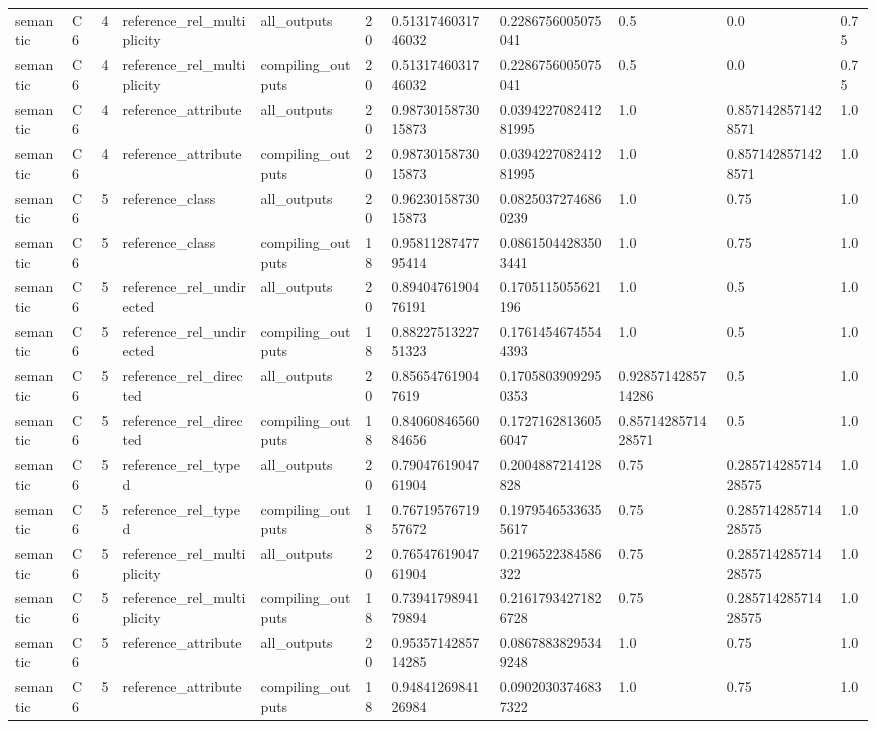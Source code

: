 \begin{tabular}{lllllllllll}
semantic & C6 & 4 & reference\_rel\_multiplicity & all\_outputs & 20 & 0.5131746031746032 & 0.2286756005075041 & 0.5 & 0.0 & 0.75 \\
semantic & C6 & 4 & reference\_rel\_multiplicity & compiling\_outputs & 20 & 0.5131746031746032 & 0.2286756005075041 & 0.5 & 0.0 & 0.75 \\
semantic & C6 & 4 & reference\_attribute & all\_outputs & 20 & 0.9873015873015873 & 0.039422708241281995 & 1.0 & 0.8571428571428571 & 1.0 \\
semantic & C6 & 4 & reference\_attribute & compiling\_outputs & 20 & 0.9873015873015873 & 0.039422708241281995 & 1.0 & 0.8571428571428571 & 1.0 \\
semantic & C6 & 5 & reference\_class & all\_outputs & 20 & 0.9623015873015873 & 0.08250372746860239 & 1.0 & 0.75 & 1.0 \\
semantic & C6 & 5 & reference\_class & compiling\_outputs & 18 & 0.9581128747795414 & 0.08615044283503441 & 1.0 & 0.75 & 1.0 \\
semantic & C6 & 5 & reference\_rel\_undirected & all\_outputs & 20 & 0.8940476190476191 & 0.1705115055621196 & 1.0 & 0.5 & 1.0 \\
semantic & C6 & 5 & reference\_rel\_undirected & compiling\_outputs & 18 & 0.8822751322751323 & 0.17614546745544393 & 1.0 & 0.5 & 1.0 \\
semantic & C6 & 5 & reference\_rel\_directed & all\_outputs & 20 & 0.856547619047619 & 0.17058039092950353 & 0.9285714285714286 & 0.5 & 1.0 \\
semantic & C6 & 5 & reference\_rel\_directed & compiling\_outputs & 18 & 0.8406084656084656 & 0.17271628136056047 & 0.8571428571428571 & 0.5 & 1.0 \\
semantic & C6 & 5 & reference\_rel\_typed & all\_outputs & 20 & 0.7904761904761904 & 0.2004887214128828 & 0.75 & 0.28571428571428575 & 1.0 \\
semantic & C6 & 5 & reference\_rel\_typed & compiling\_outputs & 18 & 0.7671957671957672 & 0.19795465336355617 & 0.75 & 0.28571428571428575 & 1.0 \\
semantic & C6 & 5 & reference\_rel\_multiplicity & all\_outputs & 20 & 0.7654761904761904 & 0.2196522384586322 & 0.75 & 0.28571428571428575 & 1.0 \\
semantic & C6 & 5 & reference\_rel\_multiplicity & compiling\_outputs & 18 & 0.7394179894179894 & 0.21617934271826728 & 0.75 & 0.28571428571428575 & 1.0 \\
semantic & C6 & 5 & reference\_attribute & all\_outputs & 20 & 0.9535714285714285 & 0.08678838295349248 & 1.0 & 0.75 & 1.0 \\
semantic & C6 & 5 & reference\_attribute & compiling\_outputs & 18 & 0.9484126984126984 & 0.09020303746837322 & 1.0 & 0.75 & 1.0 \\
\end{tabular}